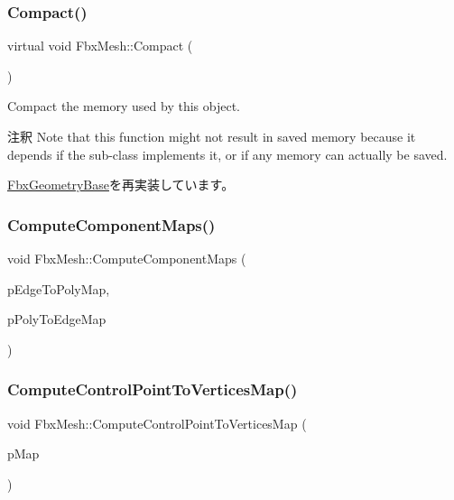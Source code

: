 \subsubsection{\texorpdfstring{Compact()}{Compact()}}
{\footnotesize\ttfamily virtual void Fbx\+Mesh\+::\+Compact (\begin{DoxyParamCaption}{ }\end{DoxyParamCaption})\hspace{0.3cm}{\ttfamily [virtual]}}

Compact the memory used by this object. \begin{DoxyRemark}{注釈}
Note that this function might not result in saved memory because it depends if the sub-\/class implements it, or if any memory can actually be saved. 
\end{DoxyRemark}


\hyperlink{class_fbx_geometry_base_a66146155ecad4e6f6f2e8cf52e0340f6}{Fbx\+Geometry\+Base}を再実装しています。

\mbox{\label{class_fbx_mesh_add00ef9f41759119264e83765697564e}} 
\subsubsection{\texorpdfstring{Compute\+Component\+Maps()}{ComputeComponentMaps()}}
{\footnotesize\ttfamily void Fbx\+Mesh\+::\+Compute\+Component\+Maps (\begin{DoxyParamCaption}\item[{\hyperlink{struct_fbx_mesh_1_1_component_map}{Component\+Map} \&}]{p\+Edge\+To\+Poly\+Map,  }\item[{\hyperlink{struct_fbx_mesh_1_1_component_map}{Component\+Map} \&}]{p\+Poly\+To\+Edge\+Map }\end{DoxyParamCaption})}

\mbox{\label{class_fbx_mesh_a6e64bf4157a20a29bf548be6dd8d90df}} 
\subsubsection{\texorpdfstring{Compute\+Control\+Point\+To\+Vertices\+Map()}{ComputeControlPointToVerticesMap()}}
{\footnotesize\ttfamily void Fbx\+Mesh\+::\+Compute\+Control\+Point\+To\+Vertices\+Map (\begin{DoxyParamCaption}\item[{\hyperlink{class_fbx_mesh_1_1_control_point_to_vertices_map}{Control\+Point\+To\+Vertices\+Map} \&}]{p\+Map }\end{DoxyParamCaption})}

